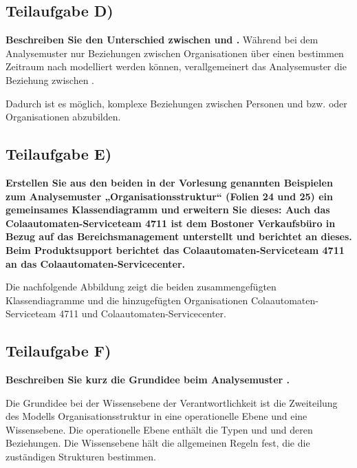 \subsection{Teilaufgabe D)}
\textbf{Beschreiben Sie den Unterschied zwischen  und
.}
Während bei dem Analysemuster  nur Beziehungen
zwischen Organisationen über einen bestimmen Zeitraum nach modelliert werden
können, verallgemeinert das Analysemuster  die Beziehung
zwischen .

Dadurch ist es möglich, komplexe Beziehungen zwischen Personen und bzw. oder
Organisationen abzubilden.

\subsection{Teilaufgabe E)}
\textbf{Erstellen Sie aus den beiden in der Vorlesung genannten Beispielen zum Analysemuster
„Organisationsstruktur“ (Folien 24 und 25) ein gemeinsames Klassendiagramm und
erweitern Sie dieses: Auch das Colaautomaten-Serviceteam 4711 ist dem Bostoner
Verkaufsbüro in Bezug auf das Bereichsmanagement unterstellt und berichtet an dieses.
Beim Produktsupport berichtet das Colaautomaten-Serviceteam 4711 an das
Colaautomaten-Servicecenter.}

Die nachfolgende Abbildung zeigt die beiden zusammengefügten Klassendiagramme
und die hinzugefügten Organisationen Colaautomaten-Serviceteam 4711 und
Colaautomaten-Servicecenter.


\subsection{Teilaufgabe F)}
\textbf{Beschreiben Sie kurz die Grundidee beim Analysemuster .}

Die Grundidee bei der Wissensebene der Verantwortlichkeit ist die Zweiteilung
des Modells Organisationsstruktur in eine operationelle Ebene und eine
Wissensebene. Die operationelle Ebene enthält die Typen
 und  und deren Beziehungen. Die
Wissensebene hält die allgemeinen Regeln fest, die die zuständigen Strukturen bestimmen.

\clearpage
